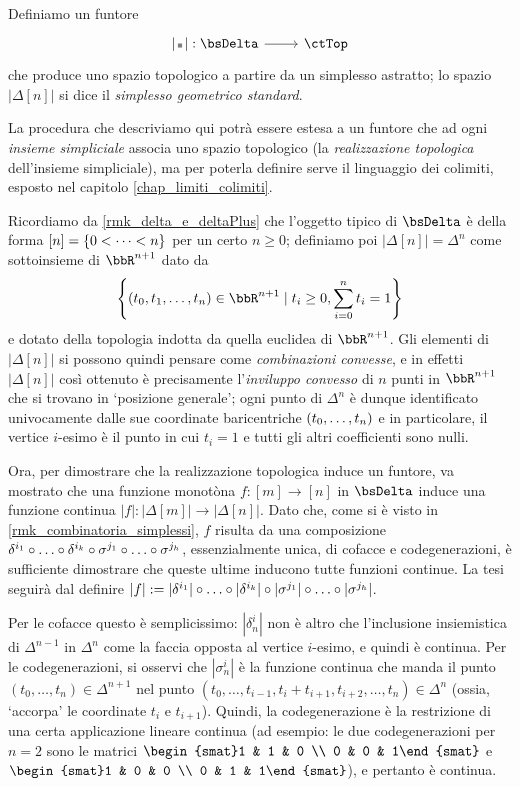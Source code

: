 \begin{definition}\label{def_real_geom}
	Definiamo un funtore
	\[\dmFun{{|\blank|}}{\bsDelta}{\ctTop}\]
	che produce uno spazio	topologico a partire da un simplesso astratto; lo spazio \(|\Delta[n]|\) si dice il \emph{simplesso geometrico standard}.

	La procedura che descriviamo qui potrà essere estesa a un funtore che ad ogni \emph{insieme simpliciale} associa uno spazio topologico (la \emph{realizzazione topologica} dell'insieme simpliciale), ma per poterla definire serve il linguaggio dei colimiti, esposto nel capitolo \ref{chap_limiti_colimiti}.

	Ricordiamo da \ref{rmk_delta_e_deltaPlus} che l'oggetto tipico di \(\bsDelta\)	è della forma \([n]=\{\iter[0][<]n\}\) per un certo \(n\ge 0\); definiamo poi \(|\Delta[n]|= \Delta^n\) come sottoinsieme di \(\bbR^{n+1}\) dato da
	\[\left\{(t_0,t_1,\dots,t_n)\in\bbR^{n+1} \mid t_i\ge 0, \sum_{i=0}^n t_i = 1\right\}\]
	e dotato della topologia indotta da quella euclidea di \(\bbR^{n+1}\). Gli elementi di \(|\Delta[n]|\) si possono quindi pensare come \emph{combinazioni convesse}, e in effetti \(|\Delta[n]|\) così ottenuto è precisamente l'\emph{inviluppo convesso} di \(n\) punti in \(\bbR^{n+1}\) che si trovano in `posizione generale'; ogni punto di \(\Delta^n\) è dunque identificato univocamente dalle sue coordinate baricentriche \((\tup[0]tn,)\) e in particolare, il vertice \(i\)-esimo è il punto in cui \(t_i=1\) e tutti gli altri coefficienti sono nulli.

	Ora, per dimostrare che la realizzazione topologica induce un funtore, va mostrato che una funzione monotòna \(f : [m]\to [n]\) in \(\bsDelta\) induce una funzione continua \(|f| : |\Delta[m]|\to |\Delta[n]|\). Dato che, come si è visto in \ref{rmk_combinatoria_simplessi}, \(f\) risulta da una composizione \(\delta^{i_1} \cmp\dots\cmp \delta^{i_k}\cmp \sigma^{j_1} \cmp\dots\cmp \sigma^{j_h}\), essenzialmente unica, di cofacce e codegenerazioni, è sufficiente dimostrare che queste ultime inducono tutte funzioni continue. La tesi seguirà dal definire \(|f|:=|\delta^{i_1}|\cmp\dots\cmp|\delta^{i_k}|\cmp|\sigma^{j_1}|\cmp\dots\cmp|\sigma^{j_h}|\).

	Per le cofacce questo è semplicissimo: \(|\delta_n^i|\) non è altro che l'inclusione	insiemistica di \(\Delta^{n-1}\) in \(\Delta^n\) come la faccia opposta al vertice \(i\)-esimo, e quindi è continua. Per le codegenerazioni, si osservi che \(|\sigma_n^i|\) è la funzione continua che manda il punto \((t_0,\dots,t_n)\in\Delta^{n+1}\) nel punto \((t_0,\dots,t_{i-1},t_i+t_{i+1},t_{i+2},\dots,t_n)\in\Delta^n\) (ossia, `accorpa' le coordinate \(t_i\) e \(t_{i+1}\)). Quindi, la codegenerazione è la restrizione di una certa applicazione	lineare continua (ad esempio: le due codegenerazioni per \(n=2\) sono le matrici \(\begin{smat}1	&	1	&	0 \\ 0	&	0	&	1\end{smat}\) e \(\begin{smat}1	&	0	&	0 \\ 0	&	1	&	1\end{smat}\)), e pertanto è continua.
\end{definition}
